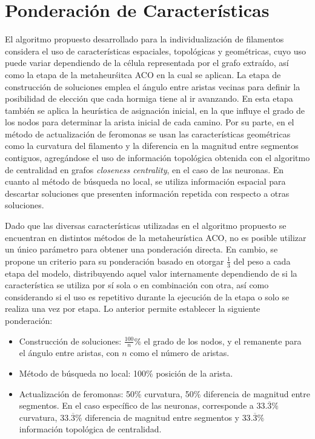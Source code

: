 \section{Ponderaci\'on de Caracter\'isticas}
\label{subsec:ponderacion}
El algoritmo propuesto desarrollado para la individualizaci\'on de filamentos considera el uso de caracter\'isticas espaciales, topol\'ogicas y geom\'etricas, cuyo uso puede variar dependiendo de la c\'elula representada por el grafo extra\'ido, as\'i como la etapa de la metaheur\'sitca ACO en la cual se aplican. La etapa de construcci\'on de soluciones emplea el \'angulo entre aristas vecinas para definir la posibilidad de elecci\'on que cada hormiga tiene al ir avanzando. En esta etapa tambi\'en se aplica la heur\'istica de asignaci\'on inicial, en la que influye el grado de los nodos para determinar la arista inicial de cada camino. Por su parte, en el m\'etodo de actualizaci\'on de feromonas se usan las caracter\'isticas geom\'etricas como la curvatura del filamento y la diferencia en la magnitud entre segmentos contiguos, agreg\'andose el uso de informaci\'on topol\'ogica obtenida con el algoritmo de centralidad en grafos {\it closeness centrality}, en el caso de las neuronas. En cuanto al m\'etodo de b\'usqueda no local, se utiliza informaci\'on espacial para descartar soluciones que presenten informaci\'on repetida con respecto a otras soluciones.


Dado que las diversas caracter\'isticas utilizadas en el algoritmo propuesto se encuentran en distintos m\'etodos de la metaheur\'istica ACO, no es posible utilizar un \'unico par\'ametro para obtener una ponderaci\'on directa. En cambio, se propone un criterio para su ponderaci\'on basado en otorgar $\frac{1}{3}$ del peso a cada etapa del modelo, distribuyendo aquel valor internamente dependiendo de si la caracter\'istica se utiliza por s\'i sola o en combinaci\'on con otra, as\'i como considerando si el uso es repetitivo durante la ejecuci\'on de la etapa o solo se realiza una vez por etapa. Lo anterior permite establecer la siguiente ponderaci\'on:

\begin{itemize}
    \item Construcci\'on de soluciones: $\frac{100}{n}$\% el grado de los nodos, y el remanente para el \'angulo entre aristas, con $n$ como el n\'umero de aristas.
    \item M\'etodo de b\'usqueda no local: 100\% posici\'on de la arista.
    \item Actualizaci\'on de feromonas: 50\% curvatura, 50\% diferencia de magnitud entre segmentos. En el caso espec\'ifico de las neuronas, corresponde a $33.\overline{3}\%$ curvatura, $33.\overline{3}\%$ diferencia de magnitud entre segmentos y $33.\overline{3}\%$ informaci\'on topol\'ogica de centralidad.
\end{itemize}

